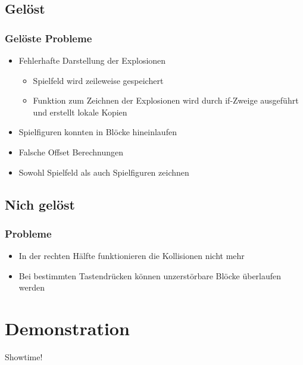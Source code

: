 \documentclass[18pt]{beamer}
\begin{document}
	\subsection{Gelöst}
	\begin{frame}
		\frametitle{Gelöste Probleme}
		\begin{itemize}
			\item Fehlerhafte Darstellung der Explosionen
			\begin{itemize}
				\item Spielfeld wird zeileweise gespeichert
				\item Funktion zum Zeichnen der Explosionen wird durch if-Zweige ausgeführt und erstellt lokale Kopien
			\end{itemize}
			\item Spielfiguren konnten in Blöcke hineinlaufen
			\item Falsche Offset Berechnungen
			\item Sowohl Spielfeld als auch Spielfiguren zeichnen
		\end{itemize}
	\end{frame}
	
	\subsection{Nich gelöst}
	\begin{frame}
		\frametitle{Probleme}
		\begin{itemize}
			\item In der rechten Hälfte funktionieren die Kollisionen nicht mehr
			\item Bei bestimmten Tastendrücken können unzerstörbare Blöcke überlaufen werden
		\end{itemize}
\end{frame}

\section{Demonstration}
	\begin{frame}
		\centering \huge	Showtime!
\end{frame}
		
\end{document}
